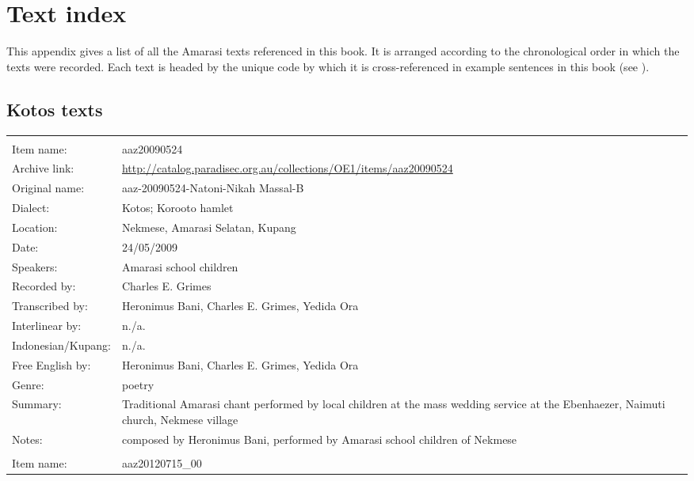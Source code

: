 \chapter{Text index}\label{app:TexInd}
This appendix gives a list of all the Amarasi texts referenced in this book.
It is arranged according to the chronological
order in which the texts were recorded.
Each text is headed by the unique code by which it is cross-referenced
in example sentences in this book (see ).

\section{Kotos texts}

\noindent
\wg\begin{longtable}{lL{.67\textwidth}}
			& \\
Item name:			& aaz20090524\\
Archive link:			& \url{http://catalog.paradisec.org.au/collections/OE1/items/aaz20090524}\\
Original name:			& aaz-20090524-Natoni-Nikah Massal-B\\
Dialect:				& Kotos; Koro{\Q}oto hamlet \\
Location:				& Nekmese{\Q}, Amarasi Selatan, Kupang \\
Date:				& 24/05/2009\\
Speakers:				& Amarasi school children\\
Recorded by:			& Charles E. Grimes\\
Transcribed by:		& Heronimus Bani, Charles E. Grimes, Yedida Ora\\
Interlinear by:		& n./a.\\
Indonesian/Kupang:		& n./a.\\
Free English by:		& Heronimus Bani, Charles E. Grimes, Yedida Ora\\
Genre:				& poetry\\
Summary:				& Traditional Amarasi chant performed by local children at the mass wedding service at the Ebenhaezer, Naimuti{\Q} church, Nekmese{\Q} village\\
Notes:				& composed by Heronimus Bani, performed by Amarasi school children of Nekmese{\Q}\\ \lspbottomrule
{}			& \\
Item name:			& aaz20120715{\_}00\\

\end{longtable}
